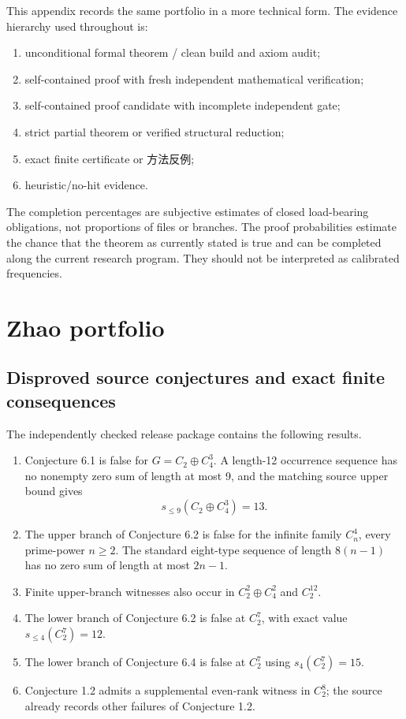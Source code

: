 \documentclass[11pt,a4paper]{ctexart}
\begin{document}
This appendix records the same portfolio in a more technical form. The evidence hierarchy used throughout is:
\begin{enumerate}
\item unconditional formal theorem / clean build and axiom audit;
\item self-contained proof with fresh independent mathematical verification;
\item self-contained proof candidate with incomplete independent gate;
\item strict partial theorem or verified structural reduction;
\item exact finite certificate or 方法反例;
\item heuristic/no-hit evidence.
\end{enumerate}

The completion percentages are subjective estimates of closed load-bearing obligations, not proportions of files or branches. The proof probabilities estimate the chance that the theorem as currently stated is true and can be completed along the current research program. They should not be interpreted as calibrated frequencies.

\section{Zhao portfolio}

\subsection{Disproved source conjectures and exact finite consequences}

The independently checked release package contains the following results.

\begin{enumerate}
\item Conjecture 6.1 is false for $G=C_2\oplus C_4^3$. A length-12 occurrence sequence has no nonempty zero sum of length at most 9, and the matching source upper bound gives
\[
s_{\le9}(C_2\oplus C_4^3)=13.
\]
\item The upper branch of Conjecture 6.2 is false for the infinite family $C_n^4$, every prime-power $n\ge2$. The standard eight-type sequence of length $8(n-1)$ has no zero sum of length at most $2n-1$.
\item Finite upper-branch witnesses also occur in $C_2^2\oplus C_4^2$ and $C_2^{12}$.
\item The lower branch of Conjecture 6.2 is false at $C_2^7$, with exact value $s_{\le4}(C_2^7)=12$.
\item The lower branch of Conjecture 6.4 is false at $C_2^7$ using $s_4(C_2^7)=15$.
\item Conjecture 1.2 admits a supplemental even-rank witness in $C_2^8$; the source already records other failures of Conjecture 1.2.
\end{enumerate}
\end{document}
